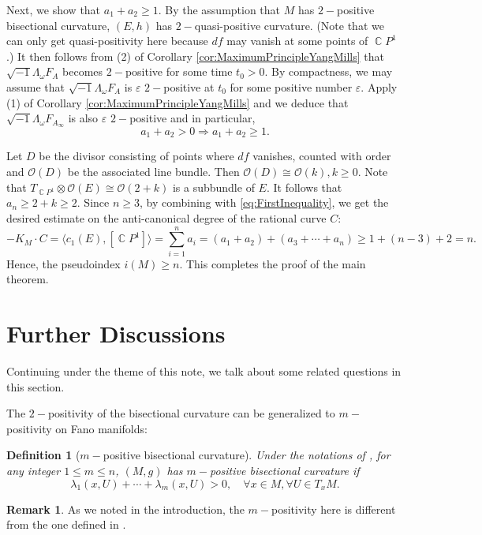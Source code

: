 \documentclass[11pt]{amsart}
\theoremstyle{plain}
\newtheorem{defn}[thm]{Definition}
\theoremstyle{definition}
\newtheorem{rk}[thm]{Remark}
\numberwithin{equation}{section}
\DeclareMathOperator{\C}{\mathbb{C}}
\begin{document}
Next, we show that $a_1+a_2\ge 1$. By the assumption that $M$ has $2-$positive bisectional curvature, $(E,h)$ has $2-$quasi-positive curvature. (Note that we can only get quasi-positivity here because $df$ may vanish at some points of $\C P^1$.) It then follows from (2) of Corollary \ref{cor:MaximumPrincipleYangMills} that $\sqrt{-1}\Lambda_\omega F_{A}$ becomes $2-$positive for some time $t_0>0$. By compactness, we may assume that $\sqrt{-1}\Lambda_\omega F_A$ is $\varepsilon$ $2-$positive at $t_0$ for some positive number $\varepsilon$. Apply (1) of Corollary \ref{cor:MaximumPrincipleYangMills} and we deduce that $\sqrt{-1}\Lambda_\omega F_{A_\infty}$ is also $\varepsilon$ $2-$positive and in particular, 
\begin{equation}\label{eq:FirstInequality}
    a_1+a_2>0\Rightarrow a_1+a_2\ge 1.
\end{equation}

Let $D$ be the divisor consisting of points where $df$ vanishes, counted with order and $\mathcal{O}(D)$ be the associated line bundle. Then $\mathcal{O}(D)\cong\mathcal{O}(k),k\ge 0$. Note that $T_{\C P^1}\otimes\mathcal{O}(E)\cong\mathcal{O}(2+k)$ is a subbundle of $E$. It follows that $a_n\ge 2+k\ge 2$. Since $n\ge 3$, by combining with \ref{eq:FirstInequality}, we get the desired estimate on the anti-canonical degree of the rational curve $C$:
\begin{equation}
    -K_M\cdot C=\langle c_1(E),[\C P^1]\rangle=\sum_{i=1}^na_i=(a_1+a_2)+(a_3+\cdots+a_n)\ge 1+(n-3)+2=n.
\end{equation}
Hence, the pseudoindex $i(M)\ge n$. This completes the proof of the main theorem.


\section{Further Discussions}\label{Sec:FurtherDiscussions}

Continuing under the theme of this note, we talk about some related questions in this section.

The $2-$positivity of the bisectional curvature can be generalized to $m-$positivity on Fano manifolds:
\begin{defn}[$m-$positive bisectional curvature]
    Under the notations of , for any integer $1\leq m\leq n$, $(M,g)$ has $m-$positive bisectional curvature if 
    \[\lambda_1(x,U)+\cdots+\lambda_m(x,U)>0,\quad \forall x\in M, \forall U\in T_xM.\]
\end{defn}
\begin{rk}
    As we noted in the introduction, the $m-$positivity here is different from the one defined in \cite{Siu80}. 
\end{rk}
\end{document}
